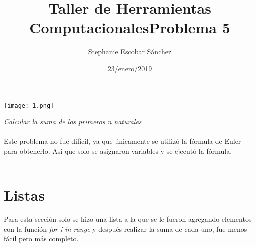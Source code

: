 \documentclass{article}
\title{\Huge Taller de Herramientas Computacionales}
\author{Stephanie Escobar Sánchez}
\date{23/enero/2019}
\begin{document}
	\maketitle
	\begin{center}
		\texttt{[image: 1.png]}	
	\end{center}
	\newpage
	\begin{center}
		\title {\Huge Problema 5} 
	\end{center}

\textit{Calcular la suma de los primeros n naturales}\\
\\
Este problema no fue difícil, ya que únicamente se utilizó la fórmula de Euler para obtenerlo. Así que solo se asignaron variables y se ejecutó la fórmula.\\
\\
\section{Listas}
Para esta sección solo se hizo una lista a la que se le fueron agregando elementos con la función \textit{for i in range} y después realizar la suma de cada uno, fue menos fácil pero más completo.
\end{document}
